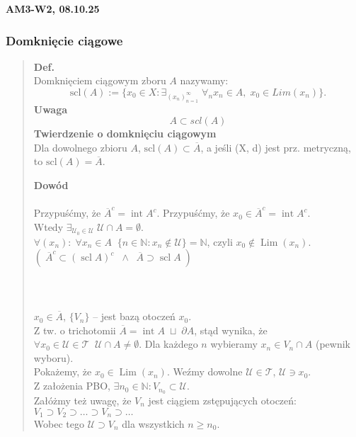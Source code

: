 \documentclass[10pt,a4paper]{article}
\newcommand{\zagadnienie}[3]{%
    \clearpage %
    \noindent\textbf{#1} #2\\
    #3
}
\begin{document}
\zagadnienie{AM3-W2, 08.10.25}{}
{
    \subsubsection*{Domknięcie ciągowe}
    \begin{quote}
    \textbf{Def.}\\
    Domknięciem ciągowym zboru $A$ nazywamy: \\
    $$\mathrm{scl}(A) := \{x_0 \in X: \exists_{(x_n)_{n=1}^{\infty}} \; \forall_n x_n \in A, \; x_0 \in Lim(x_n)\}.$$
    \textbf{Uwaga}\\
    $$A \subset scl(A)$$
    \textbf{Twierdzenie o domknięciu ciągowym} \\
    Dla dowolnego zbioru $A$, $\mathrm{scl}(A) \subset \overline{A}$, a jeśli (X, d) jest prz. metryczną, to $\mathrm{scl}(A) = \overline{A}$.
    \begin{tcolorbox}[mybox]
    \textbf{Dowód}\\\\
    Przypuśćmy, że $\overline{A}^c = \operatorname{int} A^c$. Przypuśćmy, że $x_0 \in \overline{A}^c = \operatorname{int} A^c$.\\
    Wtedy $\exists_{\mathcal{U}_0 \in \mathcal{U}} \; \mathcal{U} \cap A = \emptyset$.\\
    $\forall (x_n):\; \forall x_n \in A \;\; \{n \in \mathbb{N} : x_n \notin \mathcal{U}\} = \mathbb{N}$, czyli $x_0 \notin \operatorname{Lim}(x_n)$.\\[4pt]
    $( \; \overline{A}^c \subset (\operatorname{scl} A)^c \;\; \wedge \;\; \overline{A} \supset \operatorname{scl} A \;)$\\\\
    \text{W drugą stronę:}\\\\
    $x_0 \in \overline{A}$, $\{V_n\}$ – jest bazą otoczeń $x_0$.\\
    Z tw. o trichotomii $\overline{A} = \operatorname{int} A \;\sqcup\; \partial A$, stąd wynika, że\\
    $\forall x_0 \in \mathcal{U} \in \mathcal{T} \;\; \mathcal{U} \cap A \neq \emptyset$. Dla każdego $n$ wybieramy $x_n \in V_n \cap A$ (pewnik wyboru).\\
    Pokażemy, że $x_0 \in \operatorname{Lim}(x_n)$. Weźmy dowolne $\mathcal{U} \in \mathcal{T}$, $\mathcal{U} \ni x_0$.\\
    Z założenia PBO, $\exists n_0 \in \mathbb{N} : V_{n_0} \subset \mathcal{U}$.\\
    Załóżmy też uwagę, że $V_n$ jest ciągiem zstępujących otoczeń: $V_1 \supset V_2 \supset \dots \supset V_n \supset \dots$ \\ Wobec tego $\mathcal{U} \supset V_n$ dla wszystkich $n \ge n_0$.\\

\end{tcolorbox}
\end{quote}}
\end{document}
